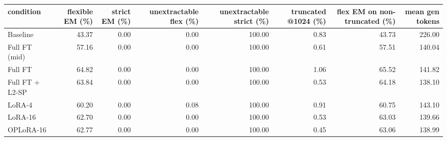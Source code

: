 \begin{tabular}{lrrrrrrr}
\toprule
condition & flexible EM (\%) & strict EM (\%) & unextractable flex (\%) & unextractable strict (\%) & truncated @1024 (\%) & flex EM on non-truncated (\%) & mean gen tokens \\
\midrule
Baseline & 43.37 & 0.00 & 0.00 & 100.00 & 0.83 & 43.73 & 226.00 \\
Full FT (mid) & 57.16 & 0.00 & 0.00 & 100.00 & 0.61 & 57.51 & 140.04 \\
Full FT & 64.82 & 0.00 & 0.00 & 100.00 & 1.06 & 65.52 & 141.82 \\
Full FT + L2-SP & 63.84 & 0.00 & 0.00 & 100.00 & 0.53 & 64.18 & 138.10 \\
LoRA-4 & 60.20 & 0.00 & 0.08 & 100.00 & 0.91 & 60.75 & 143.10 \\
LoRA-16 & 62.70 & 0.00 & 0.00 & 100.00 & 0.53 & 63.03 & 139.66 \\
OPLoRA-16 & 62.77 & 0.00 & 0.00 & 100.00 & 0.45 & 63.06 & 138.99 \\
\bottomrule
\end{tabular}
